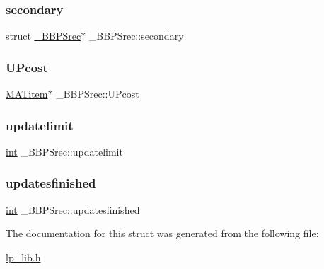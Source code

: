 \subsubsection{\texorpdfstring{secondary}{secondary}}
{\footnotesize\ttfamily struct \hyperlink{struct___b_b_p_srec}{\+\_\+\+B\+B\+P\+Srec}$\ast$ \+\_\+\+B\+B\+P\+Srec\+::secondary}

\mbox{\label{struct___b_b_p_srec_a2d959208ecbd8175dad8e786be5d7ec3}} 
\subsubsection{\texorpdfstring{U\+Pcost}{UPcost}}
{\footnotesize\ttfamily \hyperlink{lp__matrix_8h_a38536c4d327d55cc83cd661d596556da}{M\+A\+Titem}$\ast$ \+\_\+\+B\+B\+P\+Srec\+::\+U\+Pcost}

\mbox{\label{struct___b_b_p_srec_a21fdbc8626455db1d078b5049c8497ea}} 
\subsubsection{\texorpdfstring{updatelimit}{updatelimit}}
{\footnotesize\ttfamily \hyperlink{lp__lib_8h_adeb9ec6400320e4923ac9d836d509ddb}{int} \+\_\+\+B\+B\+P\+Srec\+::updatelimit}

\mbox{\label{struct___b_b_p_srec_a39bc15a8590b62826ddc018386536ea1}} 
\subsubsection{\texorpdfstring{updatesfinished}{updatesfinished}}
{\footnotesize\ttfamily \hyperlink{lp__lib_8h_adeb9ec6400320e4923ac9d836d509ddb}{int} \+\_\+\+B\+B\+P\+Srec\+::updatesfinished}



The documentation for this struct was generated from the following file\+:\begin{DoxyCompactItemize}
\item 
\hyperlink{lp__lib_8h}{lp\+\_\+lib.\+h}\end{DoxyCompactItemize}
